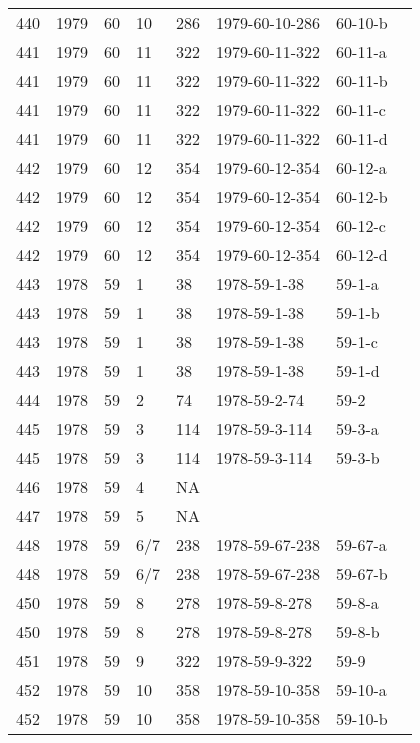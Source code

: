 \begin{longtable}{ |l|l|l|l|l|l|l|l| }
440 & 1979 & 60 &    10 &     286 & 1979-60-10-286 & 60-10-b & \\
441 & 1979 & 60 &    11 &     322 & 1979-60-11-322 & 60-11-a & \\
441 & 1979 & 60 &    11 &     322 & 1979-60-11-322 & 60-11-b & \\
441 & 1979 & 60 &    11 &     322 & 1979-60-11-322 & 60-11-c & \\
441 & 1979 & 60 &    11 &     322 & 1979-60-11-322 & 60-11-d & \\
442 & 1979 & 60 &    12 &     354 & 1979-60-12-354 & 60-12-a & \\
442 & 1979 & 60 &    12 &     354 & 1979-60-12-354 & 60-12-b & \\
442 & 1979 & 60 &    12 &     354 & 1979-60-12-354 & 60-12-c & \\
442 & 1979 & 60 &    12 &     354 & 1979-60-12-354 & 60-12-d & \\
443 & 1978 & 59 &     1 &      38 & 1978-59-1-38   & 59-1-a & \\
443 & 1978 & 59 &     1 &      38 & 1978-59-1-38   & 59-1-b & \\
443 & 1978 & 59 &     1 &      38 & 1978-59-1-38   & 59-1-c & \\
443 & 1978 & 59 &     1 &      38 & 1978-59-1-38   & 59-1-d & \\
444 & 1978 & 59 &     2 &      74 & 1978-59-2-74   & 59-2 & \\
445 & 1978 & 59 &     3 &     114 & 1978-59-3-114  & 59-3-a & \\
445 & 1978 & 59 &     3 &     114 & 1978-59-3-114  & 59-3-b & \\
446 & 1978 & 59 &     4 &      NA &                &  & \\
447 & 1978 & 59 &     5 &      NA &                &  & \\
448 & 1978 & 59 &   6/7 &     238 & 1978-59-67-238 & 59-67-a & \\
448 & 1978 & 59 &   6/7 &     238 & 1978-59-67-238 & 59-67-b & \\
450 & 1978 & 59 &     8 &     278 & 1978-59-8-278  & 59-8-a & \\
450 & 1978 & 59 &     8 &     278 & 1978-59-8-278  & 59-8-b & \\
451 & 1978 & 59 &     9 &     322 & 1978-59-9-322  & 59-9  & \\
452 & 1978 & 59 &    10 &     358 & 1978-59-10-358 & 59-10-a & \\
452 & 1978 & 59 &    10 &     358 & 1978-59-10-358 & 59-10-b & \\

\end{longtable}
